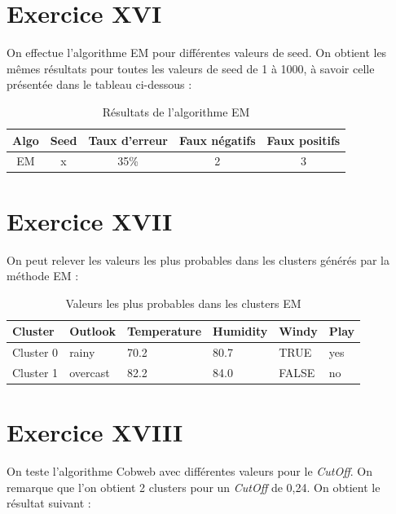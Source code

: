 \documentclass[a4paper, 11pt]{report}
\begin{document}
        
        \section{Exercice XVI}
        On effectue l'algorithme EM pour différentes valeurs de seed. On obtient les mêmes résultats pour toutes les valeurs de seed de 1 à 1000, à savoir celle présentée dans le tableau ci-dessous : 
        \begin{table}[h!]
        \centering
        \begin{tabular}{| c | c | c | c | c |}
        \hline
         Algo & Seed & Taux d'erreur & Faux négatifs & Faux positifs  \\
         \hline
         EM & x & 35\% & 2 & 3 \\
         \hline
         
        \end{tabular}
        \caption{Résultats de l'algorithme EM}
        \label{tab:exo16}
        \end{table}
        
        \section{Exercice XVII}
        On peut relever les valeurs les plus probables dans les clusters générés par la méthode EM :
        \begin{table}[h!]
        \centering
        \begin{tabular}{| l | l | l | l | l | l |}
        \hline
        Cluster & Outlook & Temperature & Humidity & Windy & Play \\
        \hline
        Cluster 0 & rainy & 70.2 & 80.7 & TRUE & yes \\
        \hline
        Cluster 1 & overcast & 82.2 & 84.0 & FALSE & no \\
        \hline

        \end{tabular}
        \caption{Valeurs les plus probables dans les clusters EM}
        \label{tab:exo_6}
        \end{table}
        
        \section{Exercice XVIII}
        On teste l'algorithme Cobweb avec différentes valeurs pour le \emph{CutOff}. On remarque que l'on obtient 2 clusters pour un \emph{CutOff} de 0,24. On obtient le résultat suivant : 
        
\end{document}
